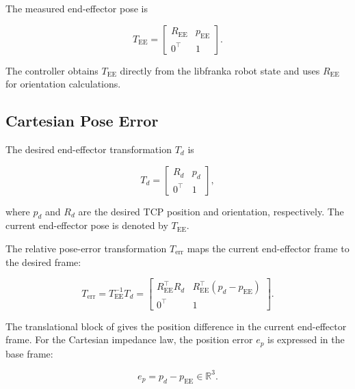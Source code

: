 The measured end-effector pose is

\begin{equation}
T_{\mathrm{EE}}
=
\begin{bmatrix}
R_{\mathrm{EE}} & p_{\mathrm{EE}}\\
0^\top & 1
\end{bmatrix}.
\label{eq:end_effector_pose}
\end{equation}

The controller obtains \mbox{\(T_{\mathrm{EE}}\)} directly from the libfranka
robot state and uses \mbox{\(R_{\mathrm{EE}}\)} for orientation calculations.



\subsection{Cartesian Pose Error}
\label{subsec:cartesian_pose_error}

The desired end-effector transformation \mbox{\(T_d\)} is

\begin{equation}
T_d
=
\begin{bmatrix}
R_d & p_d\\
0^\top & 1
\end{bmatrix},
\label{eq:desired_transformation}
\end{equation}

where \mbox{\(p_d\)} and \mbox{\(R_d\)} are the desired TCP position and orientation,
respectively. The current end-effector pose is denoted by
\mbox{\(T_{\mathrm{EE}}\)}.

The relative pose-error transformation \mbox{\(T_{\mathrm{err}}\)} maps the
current end-effector frame to the desired frame:

\begin{equation}
T_{\mathrm{err}}
=
T_{\mathrm{EE}}^{-1}T_d
=
\begin{bmatrix}
R_{\mathrm{EE}}^\top R_d &
R_{\mathrm{EE}}^\top(p_d-p_{\mathrm{EE}})\\
0^\top & 1
\end{bmatrix}.
\label{eq:expanded_transformation_error}
\end{equation}

The translational block of \mbox{} gives
the position difference in the current end-effector frame. For the Cartesian
impedance law, the position error \mbox{\(e_p\)} is expressed in the base frame:

\begin{equation}
e_p
=
p_d-p_{\mathrm{EE}}
\in\mathbb{R}^3.
\label{eq:position_control_error}
\end{equation}

